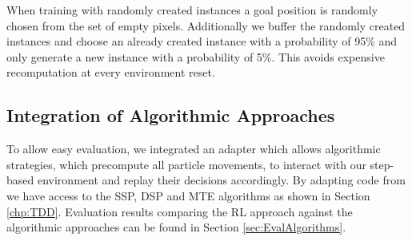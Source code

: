When training with randomly created instances a goal position is randomly chosen from the set of empty pixels. Additionally we buffer the randomly created instances and choose an already created instance with a probability of 95\% and only generate a new instance with a probability of 5\%. This avoids expensive recomputation at every environment reset.

\subsection{Integration of Algorithmic Approaches} \label{sec:AlgorithmIntegration}
To allow easy evaluation, we integrated an adapter which allows algorithmic strategies, which precompute all particle movements, to interact with our step-based environment and replay their decisions accordingly. By adapting code from \cite{becker2020} we have access to the SSP, DSP and MTE algorithms as shown in Section \ref{chp:TDD}. Evaluation results comparing the RL approach against the algorithmic approaches can be found in Section \ref{sec:EvalAlgorithms}.

